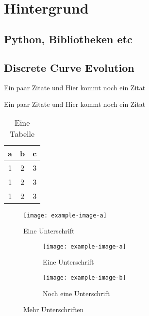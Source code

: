 \chapter{Hintergrund}
\label{ch:Hintergrund}

\blindtext

\section{Python, Bibliotheken etc}
\blindtext

\section{Discrete Curve Evolution}
Ein paar Zitate \cite{Hartley2004} und \cite{Bishop2006} Hier kommt noch ein Zitat 
\cite{DorrChristopherH.2015SSBo}
\blindmathpaper


Ein paar Zitate \cite{Hartley2004} und \cite{Bishop2006} Hier kommt noch ein Zitat 
\cite{DorrChristopherH.2015SSBo}

\begin{table}[ht]
	\centering
	\begin{tabular}{c|c|c}
		a & b & c \\ \hline
		1 & 2 & 3 \\
		1 & 2 & 3 \\
		1 & 2 & 3
	\end{tabular}
	\caption{Eine Tabelle}
\end{table}

\begin{figure}[ht]
	\centering
	\texttt{[image: example-image-a]}
	\caption{Eine Unterschrift}
\end{figure}

\begin{figure}[ht]
	\centering
	\begin{subfigure}[b]{0.45\textwidth}
		\texttt{[image: example-image-a]}
		\caption{Eine Unterschrift}
	\end{subfigure} \hfill
	\begin{subfigure}[b]{0.45\textwidth}
		\texttt{[image: example-image-b]}
		\caption{Noch eine Unterschrift}
	\end{subfigure}
	\caption{Mehr Unterschriften}
\end{figure}



